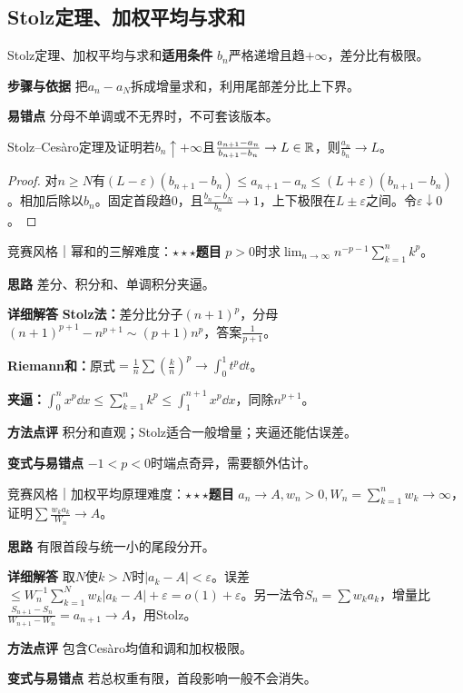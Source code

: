 \subsection{Stolz定理、加权平均与求和}\label{deep:limits_source_deep:stolz}

\begin{method}{Stolz定理、加权平均与求和}\textbf{适用条件} $b_n$严格递增且趋$+\infty$，差分比有极限。\par\textbf{步骤与依据} 把$a_n-a_N$拆成增量求和，利用尾部差分比上下界。\par\textbf{易错点} 分母不单调或不无界时，不可套该版本。\end{method}

\begin{theorem}{Stolz--Cesàro定理及证明}若$b_n\uparrow+\infty$且$\frac{a_{n+1}-a_n}{b_{n+1}-b_n}\to L\in\mathbb{R}$，则$\frac{a_n}{b_n}\to L$。\end{theorem}\begin{proof}对$n\ge N$有$(L-\varepsilon)(b_{n+1}-b_n)\le a_{n+1}-a_n\le(L+\varepsilon)(b_{n+1}-b_n)$。相加后除以$b_n$。固定首段趋0，且$\frac{b_n-b_N}{b_n}\to1$，上下极限在$L\pm\varepsilon$之间。令$\varepsilon\downarrow0$。\end{proof}

\begin{example}{竞赛风格｜幂和的三解}{难度：$\star\star\star$}\label{deep:ex:limits_source_deep:powersum}\textbf{题目} $p>0$时求$\lim_{n\to\infty}n^{-p-1}\sum_{k=1}^nk^p$。\par\textbf{思路} 差分、积分和、单调积分夹逼。\par\textbf{详细解答} \textbf{Stolz法：}差分比分子$(n+1)^p$，分母$(n+1)^{p+1}-n^{p+1}\sim(p+1)n^p$，答案$\frac{1}{p+1}$。\par\textbf{Riemann和：}原式$=\frac1n\sum(\frac{k}{n})^p\to\int_0^1t^p\dd t$。\par\textbf{夹逼：}$\int_0^nx^p\dd x\le\sum_{k=1}^nk^p\le\int_1^{n+1}x^p\dd x$，同除$n^{p+1}$。\par\textbf{方法点评} 积分和直观；Stolz适合一般增量；夹逼还能估误差。\par\textbf{变式与易错点} $-1<p<0$时端点奇异，需要额外估计。\end{example}

\begin{example}{竞赛风格｜加权平均原理}{难度：$\star\star\star$}\label{deep:ex:limits_source_deep:weighted}\textbf{题目} $a_n\to A,w_n>0,W_n=\sum_{k=1}^nw_k\to\infty$，证明$\sum \frac{w_ka_k}{W_n}\to A$。\par\textbf{思路} 有限首段与统一小的尾段分开。\par\textbf{详细解答} 取$N$使$k>N$时$|a_k-A|<\varepsilon$。误差$\le W_n^{-1}\sum_{k=1}^Nw_k|a_k-A|+\varepsilon=o(1)+\varepsilon$。另一法令$S_n=\sum w_ka_k$，增量比$\frac{S_{n+1}-S_n}{W_{n+1}-W_n}=a_{n+1}\to A$，用Stolz。\par\textbf{方法点评} 包含Cesàro均值和调和加权极限。\par\textbf{变式与易错点} 若总权重有限，首段影响一般不会消失。\end{example}

